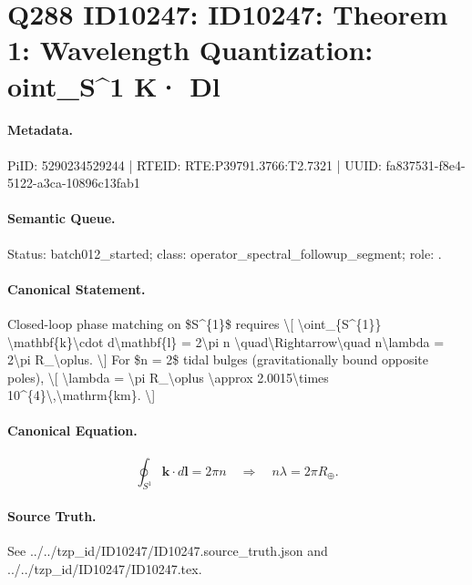 \section*{Q288 ID10247: ID10247: Theorem 1: Wavelength Quantization: oint\_S\textasciicircum{}1 K· Dl}
\paragraph{Metadata.}
PiID: 5290234529244 | RTEID: RTE:P39791.3766:T2.7321 | UUID: fa837531-f8e4-5122-a3ca-10896c13fab1

\paragraph{Semantic Queue.}
Status: batch012\_started; class: operator\_spectral\_followup\_segment; role: .

\paragraph{Canonical Statement.}
Closed-loop phase matching on \$S\textasciicircum{}\{1\}\$ requires \textbackslash{}[ \textbackslash{}oint\_\{S\textasciicircum{}\{1\}\} \textbackslash{}mathbf\{k\}\textbackslash{}cdot d\textbackslash{}mathbf\{l\} = 2\textbackslash{}pi n \textbackslash{}quad\textbackslash{}Rightarrow\textbackslash{}quad n\textbackslash{}lambda = 2\textbackslash{}pi R\_\textbackslash{}oplus. \textbackslash{}] For \$n = 2\$ tidal bulges (gravitationally bound opposite poles), \textbackslash{}[ \textbackslash{}lambda = \textbackslash{}pi R\_\textbackslash{}oplus \textbackslash{}approx 2.0015\textbackslash{}times 10\textasciicircum{}\{4\}\textbackslash{},\textbackslash{}mathrm\{km\}. \textbackslash{}]

\paragraph{Canonical Equation.}
\[
\oint_{S^{1}} \mathbf{k}\cdot d\mathbf{l} = 2\pi n \quad\Rightarrow\quad n\lambda = 2\pi R_\oplus.
\]

\paragraph{Source Truth.}
See ../../tzp\_id/ID10247/ID10247.source\_truth.json and ../../tzp\_id/ID10247/ID10247.tex.
